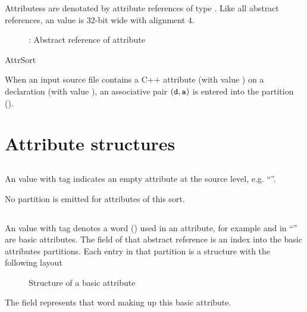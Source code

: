 \label{sec:ifc-attrs}


Attributess are denotated by attribute references of type . 
Like all abstract references, an  value is 32-bit wide with alignment $4$.
\begin{figure}[htbp]
  \centering
  \caption{: Abstract reference of attribute}
  \label{fig:ifc-attr-index}
\end{figure}

\begin{SortEnum}{AttrSort}
\end{SortEnum}

When an input source file contains a C++ attribute (with  value )
on a declaration (with  value ), an associative pair $(\mathtt{d}, \mathtt{a})$
is entered into the  partition 
().

\section{Attribute structures}
\label{sec:ifc:AttrSort-structures}

\subsection{}
\label{sec:ifc:AttrSort:Nothing}

An  value with tag  indicates an empty attribute
at the source level, e.g. ``\code{[[]]}''.

No partition is emitted for attributes of this sort.

\subsection{}
\label{sec:ifc:AttrSort:Basic}

An  value with tag  denotes a word () used in an attribute,
for example  and  in ``\code{[[answer(42)]]}'' are basic attributes.
The  field of that abstract reference is an index into the basic attributes partitions.
Each entry in that partition is a structure with the following layout
%
\begin{figure}[H]
    \centering
    \caption{Structure of a basic attribute}
    \label{fig:ifc:AttrSort:Basic}
\end{figure}
%
The  field represents that word making up this basic attribute.

